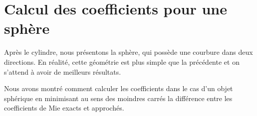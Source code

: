 \chapter{Calcul des coefficients pour une sphère}
\label{sec:sphere}
\minitoc
\newpage
{}
Après le cylindre, nous présentons la sphère, qui possède une courbure dans deux directions. En réalité, cette géométrie est plus simple que la précédente et on s'attend à avoir de meilleurs résultats. 







Nous avons montré comment calculer les coefficients dans le cas d'un objet sphérique en minimisant au sens des moindres carrés la différence entre les coefficients de Mie exacts et approchés. 
